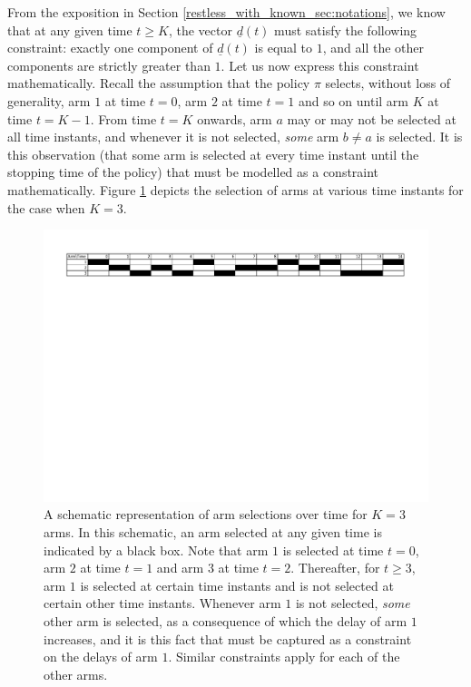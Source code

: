 From the exposition in Section \ref{restless_with_known_sec:notations}, we know that at any given time $t\geq K$, the vector $\underline{d}(t)$ must satisfy the following constraint: exactly one component of $\underline{d}(t)$ is equal to $1$, and all the other components are strictly greater than $1$. Let us now express this constraint mathematically.  Recall the assumption that the policy $\pi$ selects, without loss of generality, arm $1$ at time $t=0$, arm $2$ at time $t=1$ and so on until arm $K$ at time $t=K-1$. From time $t=K$ onwards, arm $a$ may or may not be selected at all time instants, and whenever it is not selected, \emph{some} arm $b\neq a$ is selected. It is this observation (that some arm is selected at every time instant until the stopping time of the policy) that must be modelled as a constraint mathematically. Figure \ref{restless_with_known_fig:arm_selections} depicts the selection of arms at various time instants for the case when $K=3$.
\begin{figure}
	\includegraphics[width=\textwidth]{images/Sampling.pdf}
	\caption{A schematic representation of arm selections over time for $K=3$ arms. In this schematic, an arm selected at any given time is indicated by a black box. Note that arm $1$ is selected at time $t=0$, arm $2$ at time $t=1$ and arm $3$ at time $t=2$. Thereafter, for $t\geq 3$, arm $1$ is selected at certain time instants and is not selected at certain other time instants. Whenever arm $1$ is not selected, \emph{some} other arm is selected, as a consequence of which the delay of arm $1$ increases, and it is this fact that must be captured as a constraint on the delays of arm $1$. Similar constraints apply for each of the other arms.}
	\label{restless_with_known_fig:arm_selections}
\end{figure}

